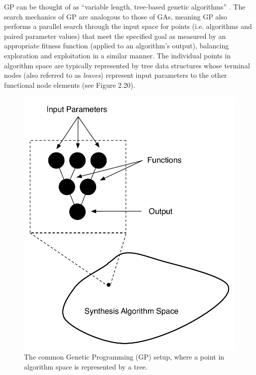 \documentclass[12pt]{report} 	%
\numberwithin{figure}{chapter}
\numberwithin{table}{chapter}
\numberwithin{equation}{chapter}
\begin{document}
\begin{flushleft}
GP can be thought of as ``variable length, tree-based genetic algorithms'' \cite[p. 29]{Teller:1998ly}. The search mechanics of GP are analogous to those of GAs, meaning GP also performs a parallel search through the input space for points (i.e. algorithms and paired parameter values) that meet the specified goal as measured by an appropriate fitness function (applied to an algorithm's output), balancing exploration and exploitation in a similar manner. The individual points in algorithm space are typically represented by tree data structures whose terminal nodes (also referred to as \textit{leaves}) represent input parameters to the other functional node elements (see Figure 2.20). 
\begin{figure}[h!]
\begin{center}
\includegraphics[scale=0.70]{GraphAsPoint}
\caption[The genetic programming paradigm]{The common Genetic Programming (GP) setup, where a point in algorithm space is represented by a tree.}
\end{center}
\end{figure}

\end{flushleft}
\end{document}
